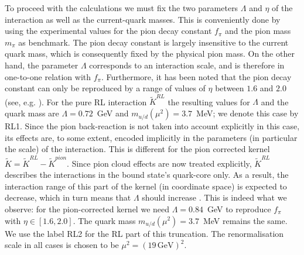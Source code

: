 To proceed with the calculations we must fix the two parameters $\Lambda$ 
and $\eta$ of the interaction as well as the 
current-quark masses. This is conveniently done by using the 
experimental values for the pion decay constant $f_\pi$ and the pion mass $m_\pi$
as benchmark. The pion decay constant is largely insensitive to the 
current quark mass, which is consequently fixed by the physical pion mass.
On the other hand, the parameter $\Lambda$ corresponds to an interaction 
scale, and is therefore in one-to-one relation with $f_\pi$. Furthermore,
it has been noted that the pion decay constant can only be reproduced by 
a range of values of $\eta$ between $1.6$ and $2.0$ (see, e.g. 
\cite{Eichmann:2011vu,Krassnigg:2009zh}). 
For the pure RL interaction $\widetilde{K}^{RL}$ the resulting values for $\Lambda$ and the quark mass
are $\Lambda=0.72$~GeV and $m_{u/d}(\mu^2)=3.7$~MeV; we denote this case by RL1.
Since the pion back-reaction is not taken into account explicitly in this case,
its effects are, to some extent, encoded implicitly in the parameters (in particular the scale) 
of the interaction. This is different for the pion corrected kernel 
$\widetilde{K} = \widetilde{K}^{RL}-\widetilde{K}^{pion}$. Since pion cloud effects are 
now treated explicitly, $\widetilde{K}^{RL}$ describes 
the interactions in the bound state's quark-core only. As a result, the 
interaction range of this part of the kernel (in coordinate space) is expected to decrease, which in turn means that 
$\Lambda$ should increase \cite{Thomas:1981vc}. This is indeed what we observe: for the 
pion-corrected kernel we need $\Lambda=0.84$~GeV to reproduce $f_\pi$ with 
$\eta \in [1.6,2.0]$. The quark mass $m_{u/d}(\mu^2)=3.7$~MeV remains the same.
We use the label RL2 for the RL part of this truncation. 
The renormalisation scale in all cases is chosen to be $\mu^2= (19 \,\mbox{GeV})^2$.

